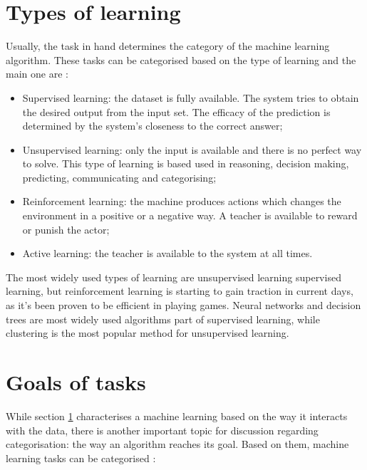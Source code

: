 \section{Types of learning}
\label{sec:ml_types}

Usually, the task in hand determines the category of the machine learning algorithm. These tasks can be categorised based on the type of learning and the main one are \cite{modernapproach} \cite{new-advances-ml}:

\begin{itemize}
\item{Supervised learning: the dataset is fully available. The system tries to obtain the desired output from the input set. The efficacy of the prediction is determined by the system's closeness to the correct answer;}
\item{Unsupervised learning: only the input is available and there is no perfect way to solve. This type of learning is based used in reasoning, decision making, predicting, communicating and categorising;}
\item{Reinforcement learning: the machine produces actions which changes the environment in a positive or a negative way. A teacher is available to reward or punish the actor;}
\item{Active learning: the teacher is available to the system at all times.}
\end{itemize}

The most widely used types of learning are unsupervised learning supervised learning, but reinforcement learning is starting to gain traction in current days, as it's been proven to be efficient in playing games. Neural networks and decision trees are most widely used algorithms part of supervised learning, while clustering is the most popular method for unsupervised learning.

\section{Goals of tasks}
\label{sec:ml_goals}

While section \ref{sec:ml_types} characterises a machine learning based on the way it interacts with the data, there is another important topic for discussion regarding categorisation: the way an algorithm reaches its goal. Based on them, machine learning tasks can be categorised \cite{modernapproach}:

